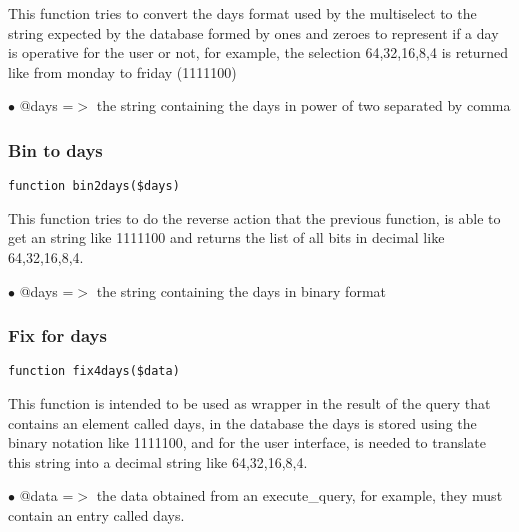 \documentclass[a4paper]{article}
\begin{document}
This function tries to convert the days format used by the multiselect
to the string expected by the database formed by ones and zeroes to
represent if a day is operative for the user or not, for example, the
selection 64,32,16,8,4 is returned like from monday to friday (1111100)

\begin{compactitem}
\item[\color{myblue}$\bullet$] @days =$>$ the string containing the days in power of two separated by comma
\end{compactitem}

\hypertarget{toc181}{}
\subsubsection{Bin to days}

\begin{lstlisting}
function bin2days($days)
\end{lstlisting}

This function tries to do the reverse action that the previous function,
is able to get an string like 1111100 and returns the list of all bits in
decimal like 64,32,16,8,4.

\begin{compactitem}
\item[\color{myblue}$\bullet$] @days =$>$ the string containing the days in binary format
\end{compactitem}

\hypertarget{toc182}{}
\subsubsection{Fix for days}

\begin{lstlisting}
function fix4days($data)
\end{lstlisting}

This function is intended to be used as wrapper in the result of the query
that contains an element called days, in the database the days is stored
using the binary notation like 1111100, and for the user interface, is needed
to translate this string into a decimal string like 64,32,16,8,4.

\begin{compactitem}
\item[\color{myblue}$\bullet$] @data =$>$ the data obtained from an execute\_query, for example, they must contain
         an entry called days.
\end{compactitem}
\end{document}
